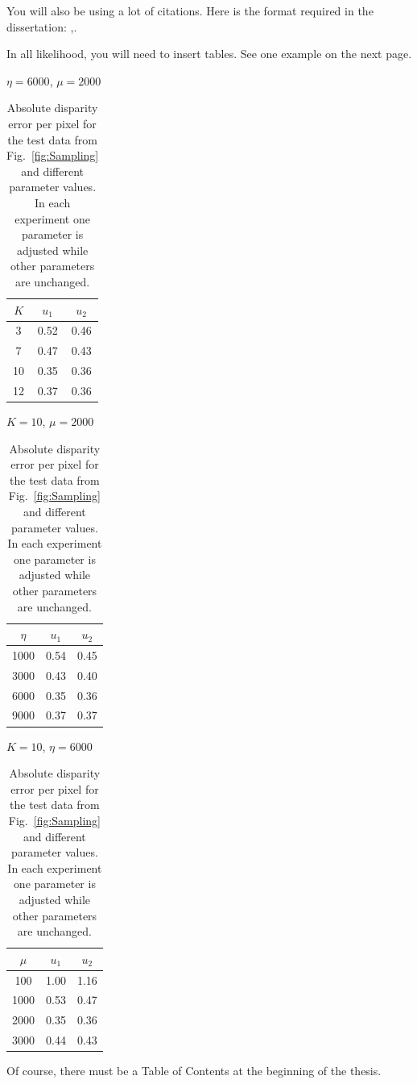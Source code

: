 You will also be using a lot of citations. Here is the format required in the dissertation: \cite{lamport1985:latex},\cite{Debr01}.

In all likelihood, you will need to insert tables. See one example on the next page.
\clearpage

\begin{table}[h]
	\caption{Absolute disparity error per pixel for the test data from
		Fig.~\ref{fig:Sampling} and different parameter values. In each experiment one
		parameter is adjusted while other parameters are unchanged.} 
	\centering
	\begin{minipage}[b]{0.30\linewidth}
		\centerline{$\eta=6000$, $\mu=2000$}\smallskip
		\centering
		\begin{tabular}{ccc}
			\hline
			$K$ & $u_1$ & $u_2$\\
			\hline
			3   & 0.52 &0.46\\
			7   & 0.47 &0.43\\
			10  & 0.35 &0.36\\
			12  & 0.37 &0.36\\
			\hline
		\end{tabular}
	\end{minipage}
	\begin{minipage}[b]{0.34\linewidth}
		\centerline{$K=10$, $\mu=2000$}\smallskip
		\centering
		\begin{tabular}{ccc}
			\hline
			$\eta$ & $u_1$ & $u_2$\\
			\hline
			1000&0.54& 0.45\\
			3000&0.43& 0.40\\
			6000&0.35& 0.36\\
			9000&0.37& 0.37\\
			\hline
		\end{tabular}
	\end{minipage}
	\begin{minipage}[b]{0.32\linewidth}
		\centerline{$K=10$, $\eta=6000$}\smallskip
		\centering
		\begin{tabular}{ccc}
			\hline
			$\mu$ & $u_1$ & $u_2$\\
			\hline
			100 &1.00&1.16\\
			1000&0.53&0.47\\
			2000&0.35&0.36\\
			3000&0.44&0.43\\
			\hline
		\end{tabular}
	\end{minipage}
	\label{tab:Parameters}
\end{table}

Of course, there must be a Table of Contents at the beginning of the thesis.